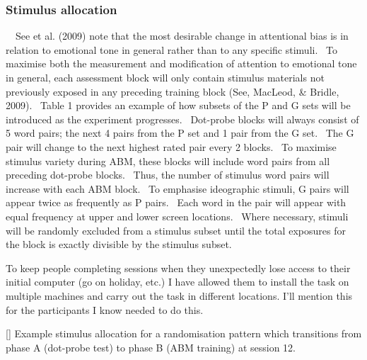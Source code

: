 \documentclass[man,floatsintext,a4paper,biblatex]{apa6}
\begin{document}
\subsubsection[Stimulus allocation]{Stimulus allocation}
\ \ See et al. (2009) note that the most desirable change in attentional bias is in relation to emotional tone in general rather than to any specific stimuli. \ To maximise both the measurement and modification of attention to emotional tone in general, each assessment block will only contain stimulus materials not previously exposed in any preceding training block (See, MacLeod, \& Bridle, 2009). \ Table 1 provides an example of how subsets of the P and G sets will be introduced as the experiment progresses. \ Dot-probe blocks will always consist of 5 word pairs; the next 4 pairs from the P set and 1 pair from the G set. \ The G pair will change to the next highest rated pair every 2 blocks. \ To maximise stimulus variety during ABM, these blocks will include word pairs from all preceding dot-probe blocks. \ Thus, the number of stimulus word pairs will increase with each ABM block. \ To emphasise ideographic stimuli, G pairs will appear twice as frequently as P pairs. \ Each word in the pair will appear with equal frequency at upper and lower screen locations. \ Where necessary, stimuli will be randomly excluded from a stimulus subset until the total exposures for the block is exactly divisible by the stimulus subset.

To keep people completing sessions when they unexpectedly lose access
to their initial computer (go on holiday, etc.) I have allowed them
to install the task on multiple machines and carry out the task in
different locations.  I'll mention this for the participants I know
needed to do this.

[]{}
Example stimulus allocation for a randomisation pattern which transitions from phase A (dot-probe test) to phase B (ABM training) at session 12.
\end{document}
